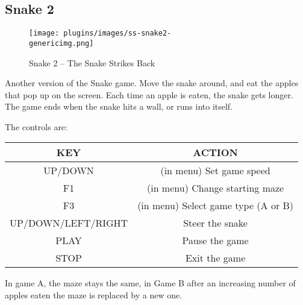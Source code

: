 \subsection{Snake 2}
\begin{figure}[h!]
\begin{center}
\texttt{[image: plugins/images/ss-snake2-\\genericimg.png]}
\end{center}
\caption{Snake 2 {--} The Snake Strikes Back}
\end{figure}

Another version of the Snake game. Move the snake around, and eat the
apples that pop up on the screen. Each time an apple is eaten, the
snake gets longer. The game ends when the snake hits a wall, or runs
into itself. 

The controls are:

\begin{table}[h!]
\begin{center}
\begin{tabular}{|c|c|}
\hline
KEY & ACTION \\\hline
UP/DOWN & (in menu) Set game speed \\\hline
F1 & (in menu) Change starting maze \\\hline
F3 & (in menu) Select game type (A or B) \\\hline
UP/DOWN/LEFT/RIGHT & Steer the snake \\\hline
PLAY & Pause the game \\\hline
STOP & Exit the game \\\hline
\end{tabular}
\end{center}
\end{table}
In game A, the maze stays the same, in Game B
after an increasing number of apples eaten the maze is replaced by a
new one.

